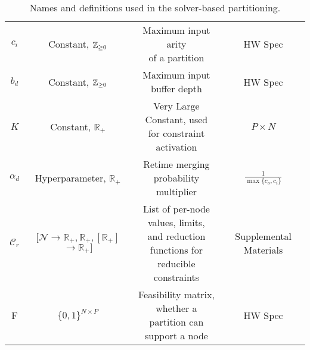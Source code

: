 \begin{table*}
\begin{tabularx}{\textwidth}{cccc}
    $c_i$ & Constant, $\mathbb{Z}_{\ge 0}$ & \ccell{Maximum input arity\\ of a partition} & HW Spec \\[0.5cm]
    $b_d$ & Constant, $\mathbb{Z}_{\ge 0}$ & \ccell{Maximum input\\ buffer depth} & HW Spec \\[0.5cm]
    $K$ & Constant, $\mathbb{R}_+$ & \ccell{Very Large Constant, used\\ for constraint activation} & $P \times N$ \\[0.5cm]
    $\alpha_d$ & Hyperparameter, $\mathbb{R}_+$ & \ccell{Retime merging\\ probability multiplier}& $\frac{1}{\max\{c_o, c_i\}}$ \\[0.5cm]
    $\mathcal{C}_r$& \ccell{$[\mathcal{N} \to \mathbb{R}_+,\mathbb{R}_+, [\mathbb{R}_+]$\\$ \to \mathbb{R}_+]$} & 
    \ccell{List of per-node values, limits,\\ and reduction functions for\\ reducible constraints}& Supplemental Materials\\[0.7cm]

    F & $\{0, 1\}^{N \times P}$ & \ccell{Feasibility matrix, whether a\\ partition can support a node}& HW Spec \\ 
    \bottomrule
  \end{tabularx}
  \caption{Names and definitions used in the solver-based partitioning.}
  \label{tab:solver-variables}
\end{table*}

